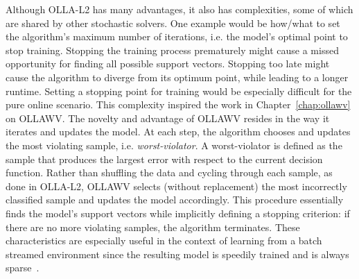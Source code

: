 \documentclass[reqno]{vcuthesis}
\numberwithin{equation}{chapter}
\begin{document}
Although OLLA-L2 has many advantages, it also has complexities, some of which are shared by other stochastic solvers. One example would be how/what to set the algorithm's maximum number of iterations, i.e. the model's optimal point to stop training. Stopping the training process prematurely might cause a missed opportunity for finding all possible support vectors. Stopping too late might cause the algorithm to diverge from its optimum point, while leading to a longer runtime. Setting a stopping point for training would be especially difficult for the pure online scenario. This complexity inspired the work in Chapter~\ref{chap:ollawv} on OLLAWV. The novelty and advantage of OLLAWV resides in the way it iterates and updates the model. At each step, the algorithm chooses and updates the most violating sample, i.e. \textit{worst-violator}. A worst-violator is defined as the sample that produces the largest error with respect to the current decision function. Rather than shuffling the data and cycling through each sample, as done in OLLA-L2, OLLAWV selects (without replacement) the most incorrectly classified sample and updates the model accordingly. This procedure essentially finds the model's support vectors while implicitly defining a stopping criterion: if there are no more violating samples, the algorithm terminates. These characteristics are especially useful in the context of learning from a batch streamed environment since the resulting model is speedily trained and is always sparse~\cite{melki2018ollawv}. 
\end{document}
